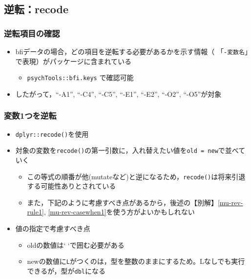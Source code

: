 \documentclass[
  xelatex,ja=standard, b5paper]{bxjsbook}
\providecommand{\tightlist}{%
  \setlength{\itemsep}{0pt}\setlength{\parskip}{0pt}}
\begin{document}
\hypertarget{mu-rev-recode}{%
\subsection{逆転：recode}\label{mu-rev-recode}}

\hypertarget{mu-rev-check}{%
\subsubsection{逆転項目の確認}\label{mu-rev-check}}

\begin{itemize}
\tightlist
\item
  bfiデータの場合，どの項目を逆転する必要があるかを示す情報（
  「\texttt{-変数名}」で表現）がパッケージに含まれている

  \begin{itemize}
  \tightlist
  \item
    \texttt{psychTools::bfi.keys} で確認可能
  \end{itemize}
\item
  したがって，``-A1'', ``-C4'', ``-C5'', ``-E1'', ``-E2'', ``-O2'', ``-O5''が対象
\end{itemize}

\hypertarget{mu-rev-recode1}{%
\subsubsection{変数1つを逆転}\label{mu-rev-recode1}}

\begin{itemize}
\tightlist
\item
  \texttt{dplyr::recode()}を使用
\item
  対象の変数を\texttt{recode()}の第一引数に，入れ替えたい値を\texttt{old\ =\ new}で並べていく

  \begin{itemize}
  \tightlist
  \item
    この等式の順番が他(mutateなど)と逆になるため，\texttt{recode()}は将来引退する可能性ありとされている
  \item
    また，下記のように考慮すべき点があるから，後述の【別解】\ref{mu-rev-rule1}, \ref{mu-rev-casewhen1}を使う方がよいかもしれない
  \end{itemize}
\item
  値の指定で考慮すべき点

  \begin{itemize}
  \tightlist
  \item
    oldの数値は` `で囲む必要がある
  \item
    newの数値に\texttt{L}がつくのは，型を整数のままにするため。Lなしでも実行できるが，型が\texttt{dbl}になる
  \end{itemize}
\end{itemize}
\end{document}
